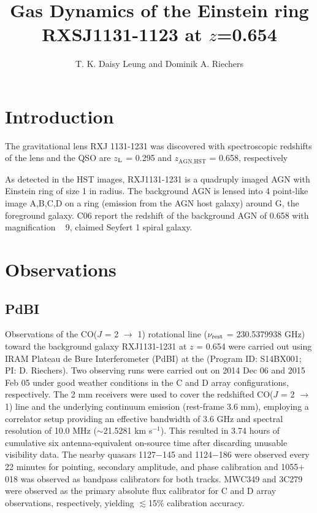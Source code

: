 \documentclass[]{emulateapj}
\begin{document}

\title{Gas Dynamics of the Einstein ring RXSJ1131-1123 at $z$=0.654}
\author{T. K. Daisy Leung and Dominik A. Riechers}


\begin{abstract}
\end{abstract}

\section{Introduction} 
The gravitational lens RXJ 1131-1231 was discovered with spectroscopic
redshifts of the lens and the QSO are $z_{\rm L}$ = 0.295 and
$z_\textrm{AGN,HST}$ = 
0.658, respectively \citep{}



As detected in the HST images, RXJ1131-1231 is a quadruply imaged AGN with Einstein ring of size 1 in radius. The 
background AGN is lensed into 4 point-like image A,B,C,D on a ring (emission from the AGN host galaxy) around G, the foreground galaxy. 
C06 report the redshift of the background AGN of 0.658 with magnification ~ 9, claimed Seyfert 1 spiral galaxy.




\section{Observations}
\subsection{PdBI} \label{sec:PdBIdata}
Observations of the CO($J$ = 2 $\rightarrow$ 1) rotational line ($\nu_{\rm
rest}$ = 230.5379938 GHz) toward the background galaxy RXJ1131-1231 at $z$ = 0.654
 were carried out using IRAM Plateau de Bure Interferometer (PdBI) at the
(Program ID: S14BX001; PI: D. Riechers). 
 Two observing runs were carried out on 2014 Dec 06 and 2015 Feb 05 under good
weather conditions in the C and D array configurations, respectively. The 2 mm
receivers were used to cover the redshifted CO($J$ = 2 $\rightarrow$ 1) line
and the 
underlying continuum emission (rest-frame 3.6 mm), employing
a correlator setup providing an effective bandwidth of 3.6 GHz and spectral 
resolution of 10.0 MHz ($\sim$21.5281 km s$^{-1}$).
This resulted in 3.74 hours of cumulative six antenna-equivalent on-source time
after discarding unusable visibility data.
The nearby quasars 1127$-$145 and 1124$-$186 were observed every 22 minutes
for
pointing, secondary amplitude, and phase calibration and 1055$+$018 was observed as bandpass calibrators 
for both tracks.
MWC349 and 3C279 were observed
as the primary
absolute flux calibrator for C and D array observations, respectively, yielding $\lesssim
$15\% calibration accuracy.
\end{document}
